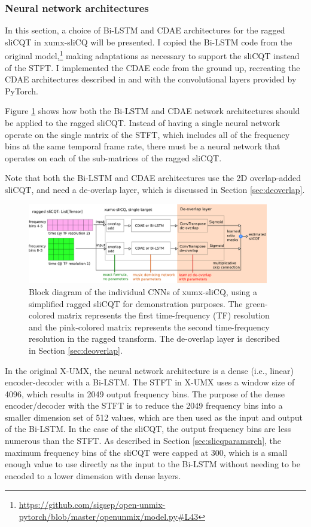 \documentclass[report.tex]{subfiles}
\begin{document}
\subsubsection{Neural network architectures}
\label{sec:slicqarches}

In this section, a choice of Bi-LSTM and CDAE architectures for the ragged sliCQT in xumx-sliCQ will be presented. I copied the Bi-LSTM code from the original model,\footnote{\url{https://github.com/sigsep/open-unmix-pytorch/blob/master/openunmix/model.py\#L43}} making adaptations as necessary to support the sliCQT instead of the STFT. I implemented the CDAE code from the ground up, recreating the CDAE architectures described in \textcite{plumbley1} and \textcite{plumbley2} with the convolutional layers provided by PyTorch.

Figure \ref{fig:cdaeslicqt} shows how both the Bi-LSTM and CDAE network architectures should be applied to the ragged sliCQT. Instead of having a single neural network operate on the single matrix of the STFT, which includes all of the frequency bins at the same temporal frame rate, there must be a neural network that operates on each of the sub-matrices of the ragged sliCQT.

Note that both the Bi-LSTM and CDAE architectures use the 2D overlap-added sliCQT, and need a de-overlap layer, which is discussed in Section \ref{sec:deoverlap}.

\begin{figure}[ht]
	\centering
	\includegraphics[width=0.9375\textwidth]{./images-blockdiagrams/xumx_slicq_pertarget_cdae_bilstm.png}
	\caption{Block diagram of the individual CNNs of xumx-sliCQ, using a simplified ragged sliCQT for demonstration purposes. The green-colored matrix represents the first time-frequency (TF) resolution and the pink-colored matrix represents the second time-frequency resolution in the ragged transform. The de-overlap layer is described in Section \ref{sec:deoverlap}.}
	\label{fig:cdaeslicqt}
\end{figure}

In the original X-UMX, the neural network architecture is a dense (i.e., linear) encoder-decoder with a Bi-LSTM. The STFT in X-UMX uses a window size of 4096, which results in 2049 output frequency bins. The purpose of the dense encoder/decoder with the STFT is to reduce the 2049 frequency bins into a smaller dimension set of 512 values, which are then used as the input and output of the Bi-LSTM. In the case of the sliCQT, the output frequency bins are less numerous than the STFT. As described in Section \ref{sec:slicqparamsrch}, the maximum frequency bins of the sliCQT were capped at 300, which is a small enough value to use directly as the input to the Bi-LSTM without needing to be encoded to a lower dimension with dense layers.
\end{document}
